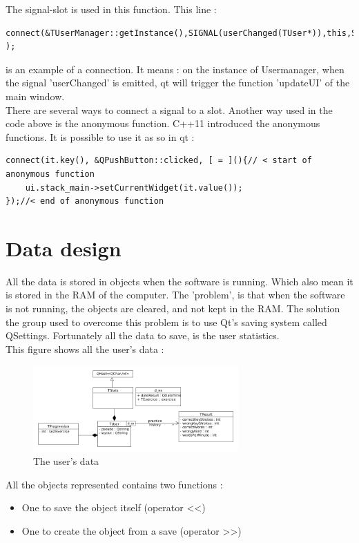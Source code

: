 The signal-slot is used in this function. This line : 
\begin{lstlisting}
connect(&TUserManager::getInstance(),SIGNAL(userChanged(TUser*)),this,SLOT(updateUI(TUser*)) );
\end{lstlisting}
is an example of a connection. It means : on the instance of Usermanager, when the signal 'userChanged' is emitted, qt will trigger the function 'updateUI' of the main window.\\
There are several ways to connect a signal to a slot. Another way used in the code above is the anonymous function. C++11 introduced the anonymous functions. It is possible to use it as so in qt :
\begin{lstlisting}
connect(it.key(), &QPushButton::clicked, [ = ](){// < start of anonymous function
	ui.stack_main->setCurrentWidget(it.value());
});//< end of anonymous function
\end{lstlisting}



\chapter{Data design}
All the data is stored in objects when the software is running. Which also mean it is stored in the RAM of the computer.
The 'problem', is that when the software is not running, the objects are cleared, and not kept in the RAM. The solution the group used to overcome this problem is to use Qt's saving system called QSettings. Fortunately all the data to save, is the user statistics.\\
This figure shows all the user's data :

\begin{figure}[H]
	\centering
	\includegraphics[width=0.7\textwidth]{images/diagram-data.png}
	 \caption{The user's data}
	 \label{diagram-data}
\end{figure}

All the objects represented contains two functions :
\begin{itemize}
	\item One to save the object itself (operator <<)
	\item One to create the object from a save (operator >>)
\end{itemize}

